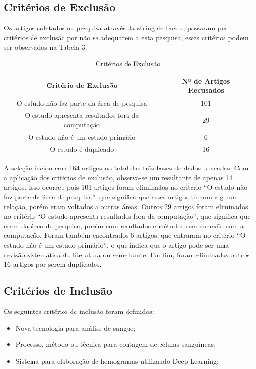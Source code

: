 \subsection{Critérios de Exclusão}

Os artigos coletados na pesquisa através da string de busca, passaram por critérios de exclusão por não se adequarem a esta pesquisa, esses critérios podem ser observados na Tabela 3. 

\begin{table}[!htb]
\centering
\caption{Critérios de Exclusão}
\label{tbl:exclusao}
\begin{tabular}{|c|c|}
\hline
\textbf{Critério de Exclusão} & \textbf{Nº de Artigos Recusados} \\ \hline
O estudo não faz parte da área de pesquisa & 101 \\ \hline
O estudo apresenta resultados fora da computação & 29 \\ \hline
O estudo não é um estudo primário & 6 \\ \hline
O estudo é duplicado & 16 \\ \hline
\end{tabular}
\vspace{6pt}
\end{table}

A seleção inciou com 164 artigos no total das três bases de dados buscadas. Com a aplicação dos critérios de exclusão, observa-se um resultante de apenas 14 artigos. Isso ocorreu pois 101 artigos foram eliminados no critério ``O estudo não faz parte da área de pesquisa'', que significa que esses artigos tinham alguma relação, porém eram voltados a outras áreas. Outros 29 artigos foram eliminados no critério ``O estudo apresenta resultados fora da computação'', que significa que eram da área de pesquisa, porém com resultados e métodos sem conexão com a computação. Foram também encontrados 6 artigos, que entraram no critério ``O estudo não é um estudo primário'', o que indica que o artigo pode ser uma revisão sistemática da literatura ou semelhante. Por fim, foram eliminados outros 16 artigos por serem duplicados.

\subsection{Critérios de Inclusão}

Os seguintes critérios de inclusão foram definidos:
\begin{itemize}
\item Nova tecnologia para análise de sangue;
\item Processo, método ou técnica para contagem de células sanguíneas;
\item Sistema para elaboração de hemogramas utilizando Deep Learning;
\end{itemize}

